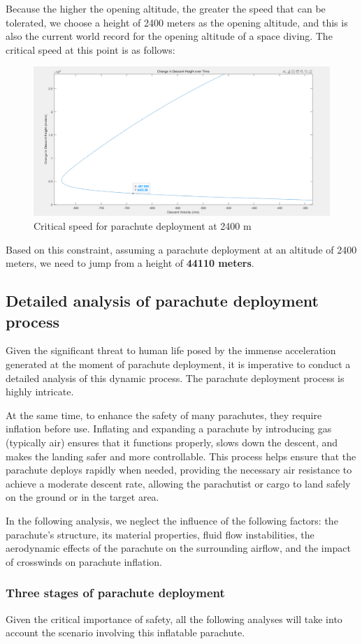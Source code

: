 \documentclass[12pt]{article}
\begin{document}
Because the higher the opening altitude, the greater the speed that can be tolerated, we choose a height of 2400 meters as the opening altitude, 
and this is also the current world record for the opening altitude of a space diving.
The critical speed at this point is as follows:
\begin{figure}[!hbtp]
    \centering 
    \includegraphics[width = 0.4\linewidth]{image/020.png}
    \caption{Critical speed for parachute deployment at 2400 m}
\end{figure}

Based on this constraint, assuming a parachute deployment at an altitude of 2400 meters, 
we need to jump from a height of \textbf{44110 meters}.

\subsection{Detailed analysis of parachute deployment process}

Given the significant threat to human life posed by the immense acceleration generated at the moment 
of parachute deployment, it is imperative to conduct a detailed analysis of this dynamic process. 
The parachute deployment process is highly intricate. 

At the same time, to enhance the safety of many parachutes, they require inflation before use. Inflating and expanding 
a parachute by introducing gas (typically air) ensures that it functions properly, slows down the 
descent, and makes the landing safer and more controllable. This process helps ensure that the 
parachute deploys rapidly when needed, providing the necessary air resistance to achieve a moderate 
descent rate, allowing the parachutist or cargo to land safely on the ground or in the target area.

In the following analysis, we neglect the influence of the following factors: the parachute's 
structure, its material properties, fluid flow instabilities, the aerodynamic effects of the parachute on 
the surrounding airflow, and the impact of crosswinds on parachute inflation.

\subsubsection{Three stages of parachute deployment}
Given the critical importance of safety, all the following analyses will 
take into account the scenario involving this inflatable parachute. 
\end{document}
